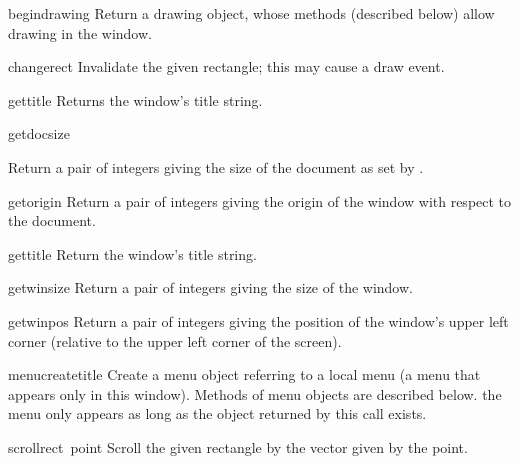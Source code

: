 \begin{funcdesc}{begindrawing}{}
Return a drawing object, whose methods (described below) allow drawing
in the window.
\end{funcdesc}

\begin{funcdesc}{change}{rect}
Invalidate the given rectangle; this may cause a draw event.
\end{funcdesc}

\begin{funcdesc}{gettitle}{}
Returns the window's title string.
\end{funcdesc}

\begin{funcdesc}{getdocsize}{}
\begin{sloppypar}
Return a pair of integers giving the size of the document as set by
.
\end{sloppypar}
\end{funcdesc}

\begin{funcdesc}{getorigin}{}
Return a pair of integers giving the origin of the window with respect
to the document.
\end{funcdesc}

\begin{funcdesc}{gettitle}{}
Return the window's title string.
\end{funcdesc}

\begin{funcdesc}{getwinsize}{}
Return a pair of integers giving the size of the window.
\end{funcdesc}

\begin{funcdesc}{getwinpos}{}
Return a pair of integers giving the position of the window's upper
left corner (relative to the upper left corner of the screen).
\end{funcdesc}

\begin{funcdesc}{menucreate}{title}
Create a menu object referring to a local menu (a menu that appears
only in this window).
Methods of menu objects are described below.
 the menu only appears as long as the object
returned by this call exists.
\end{funcdesc}

\begin{funcdesc}{scroll}{rect\, point}
Scroll the given rectangle by the vector given by the point.
\end{funcdesc}

